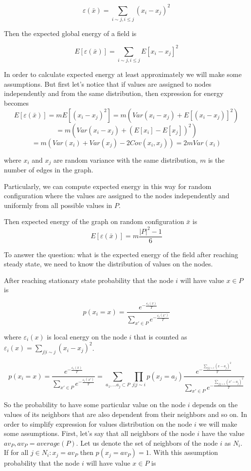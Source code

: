 \documentclass[12pt]{report}
\begin{document}
$$ \varepsilon (\bar{x}) =  \sum\limits_{i \sim j, i \leq j} (x_i - x_j)^2  $$

Then the expected global energy of a field is

$$ E[\varepsilon (\bar{x})] =  \sum\limits_{i \sim j, i \leq j} E[x_i - x_j]^2  $$

In order to calculate expected energy at least approximately we will make some assumptions. 
But first let's notice that if values are assigned to nodes independently and from the same distribution, then expression for energy becomes
$$ E[\varepsilon (\bar{x})] =  mE[(x_i - x_j)^2]  = m\left(Var(x_i - x_j) + E[(x_i - x_j)]^2\right) $$
$$ = m\left(Var(x_i - x_j) + (E[x_i] - E[x_j])^2\right)$$
$$ = m\left( Var(x_i) + Var(x_j) - 2Cov(x_i, x_j)  \right) = 2mVar(x_i)$$

where $x_i$ and $x_j$ are random variance with the same distribution, $m$ is the number of edges in the graph. 

Particularly, we can compute expected energy in this way for random configuration where the values are assigned to the nodes independently and uniformly from all possible values in $P$. 

Then expected energy of the graph on random configuration $\bar{x}$ is
$$E[\varepsilon (\bar{x})] =  m\frac{|P|^2-1}{6}$$

To answer the question: what is the expected energy of the field after reaching steady state, we need to know the distribution of values on the nodes.


After reaching stationary state probability that the node $i$ will have value $x \in P$ is

$$ p(x_i = x) = \frac{ e^{-\frac{\varepsilon_i(x)}{T}} }{ \sum\limits_{x'\in P} e^{-\frac{\varepsilon_i(x')}{T}}} $$

where $\varepsilon_i(x)$ is local energy on the node $i$ that is counted as $\varepsilon_i(x) = \sum\limits_{j | i \sim j} (x_i - x_j)^2 $. 
  
  
$$ p(x_i = x) = \frac{ e^{-\frac{\varepsilon_i(x)}{T}} }{ \sum\limits_{x'\in P} e^{-\frac{\varepsilon_i(x')}{T}}}  = 
\sum\limits_{a_1, ... a_j \subset P} \prod\limits_{j|j \sim i} p(x_j  = a_j)
\frac{ e^{-\frac{ \sum\limits_{j|j \sim i}(x - a_j)^2 }{T}} }{ \sum\limits_{x'\in P} e^{-\frac{ \sum\limits_{j|j \sim i}(x' - a_j)^2 }{T}}}  $$

So the probability to have some particular value on the node $i$ depends on the values of its neighbors that are also dependent from their neighbors and so on.
In order to simplify expression for values distribution on the node $i$ we will make some assumptions. First, let's say that all neighbors of the node $i$ have the value $av_P, av_P = average(P)$. Let us denote the set of neighbors of the node $i$ as $N_i$. If for all $j \in N_i : x_j = av_P$ then 
$p(x_j  = av_P) = 1$. With this assumption probability that the node $i$ will have value $x \in P$ is
\end{document}
